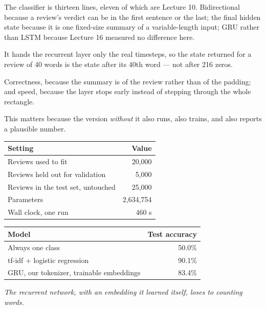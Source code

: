 \documentclass[11pt,a4paper]{article}
\begin{document}
The classifier is thirteen lines, eleven of which are Lecture 10. Bidirectional
because a review's verdict can be in the first sentence or the last; the final
hidden state because it is one fixed-size summary of a variable-length input;
GRU rather than LSTM because Lecture 16 measured no difference here.

\begin{keybox}[title={\code{pack\_padded\_sequence}, and what it prevents}]
It hands the recurrent layer only the real timesteps, so the state returned for
a review of 40 words is the state after its 40th word --- not after 216 zeros.

Correctness, because the summary is of the review rather than of the padding;
and speed, because the layer stops early instead of stepping through the whole
rectangle.

This matters because the version \emph{without} it also runs, also trains, and
also reports a plausible number.
\end{keybox}

\begin{center}
\small
\begin{tabular}{lr}
\toprule
\textbf{Setting} & \textbf{Value} \\
\midrule
Reviews used to fit & 20{,}000 \\
Reviews held out for validation & 5{,}000 \\
Reviews in the test set, untouched & 25{,}000 \\
Parameters & 2{,}634{,}754 \\
Wall clock, one run & 460 s \\
\bottomrule
\end{tabular}
\end{center}

\begin{center}
\small
\begin{tabular}{lr}
\toprule
\textbf{Model} & \textbf{Test accuracy} \\
\midrule
Always one class & 50.0\% \\
tf-idf + logistic regression & 90.1\% \\
GRU, our tokenizer, trainable embeddings & 83.4\% \\
\bottomrule
\end{tabular}
\end{center}

\emph{The recurrent network, with an embedding it learned itself, loses to
counting words.}
\end{document}
